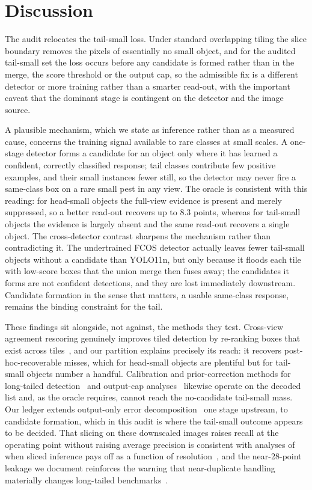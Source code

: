 \section{Discussion}\label{sec:discussion}

The audit relocates the tail-small loss. Under standard overlapping tiling the slice boundary removes the pixels of essentially no small object, and for the audited tail-small set the loss occurs before any candidate is formed rather than in the merge, the score threshold or the output cap, so the admissible fix is a different detector or more training rather than a smarter read-out, with the important caveat that the dominant stage is contingent on the detector and the image source.

A plausible mechanism, which we state as inference rather than as a measured cause, concerns the training signal available to rare classes at small scales. A one-stage detector forms a candidate for an object only where it has learned a confident, correctly classified response; tail classes contribute few positive examples, and their small instances fewer still, so the detector may never fire a same-class box on a rare small pest in any view. The oracle is consistent with this reading: for head-small objects the full-view evidence is present and merely suppressed, so a better read-out recovers up to 8.3 points, whereas for tail-small objects the evidence is largely absent and the same read-out recovers a single object. The cross-detector contrast sharpens the mechanism rather than contradicting it. The undertrained FCOS detector actually leaves fewer tail-small objects without a candidate than YOLO11n, but only because it floods each tile with low-score boxes that the union merge then fuses away; the candidates it forms are not confident detections, and they are lost immediately downstream. Candidate formation in the sense that matters, a usable same-class response, remains the binding constraint for the tail.

These findings sit alongside, not against, the methods they test. Cross-view agreement rescoring genuinely improves tiled detection by re-ranking boxes that exist across tiles~\citep{na2026crossview}, and our partition explains precisely its reach: it recovers post-hoc-recoverable misses, which for head-small objects are plentiful but for tail-small objects number a handful. Calibration and prior-correction methods for long-tailed detection~\citep{pan2021norcal,alexandridis2025fracal} and output-cap analyses~\citep{dave2021devil} likewise operate on the decoded list and, as the oracle requires, cannot reach the no-candidate tail-small mass. Our ledger extends output-only error decomposition~\citep{hoiem2012diagnosing,bolya2020tide} one stage upstream, to candidate formation, which in this audit is where the tail-small outcome appears to be decided. That slicing on these downscaled images raises recall at the operating point without raising average precision is consistent with analyses of when sliced inference pays off as a function of resolution~\citep{becker2026scahi}, and the near-28-point leakage we document reinforces the warning that near-duplicate handling materially changes long-tailed benchmarks~\citep{nguyen2026ip102taildet}.

